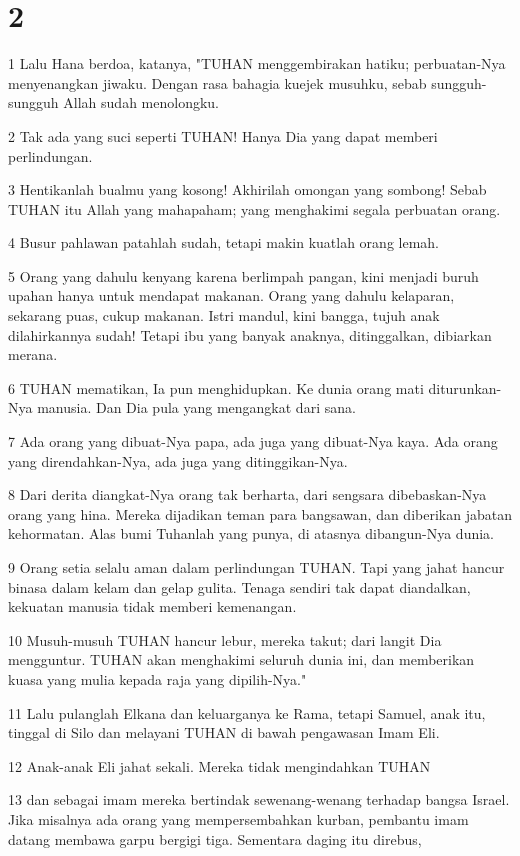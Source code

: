 \chapter{2}

\par 1 Lalu Hana berdoa, katanya, "TUHAN menggembirakan hatiku; perbuatan-Nya menyenangkan jiwaku. Dengan rasa bahagia kuejek musuhku, sebab sungguh-sungguh Allah sudah menolongku.
\par 2 Tak ada yang suci seperti TUHAN! Hanya Dia yang dapat memberi perlindungan.
\par 3 Hentikanlah bualmu yang kosong! Akhirilah omongan yang sombong! Sebab TUHAN itu Allah yang mahapaham; yang menghakimi segala perbuatan orang.
\par 4 Busur pahlawan patahlah sudah, tetapi makin kuatlah orang lemah.
\par 5 Orang yang dahulu kenyang karena berlimpah pangan, kini menjadi buruh upahan hanya untuk mendapat makanan. Orang yang dahulu kelaparan, sekarang puas, cukup makanan. Istri mandul, kini bangga, tujuh anak dilahirkannya sudah! Tetapi ibu yang banyak anaknya, ditinggalkan, dibiarkan merana.
\par 6 TUHAN mematikan, Ia pun menghidupkan. Ke dunia orang mati diturunkan-Nya manusia. Dan Dia pula yang mengangkat dari sana.
\par 7 Ada orang yang dibuat-Nya papa, ada juga yang dibuat-Nya kaya. Ada orang yang direndahkan-Nya, ada juga yang ditinggikan-Nya.
\par 8 Dari derita diangkat-Nya orang tak berharta, dari sengsara dibebaskan-Nya orang yang hina. Mereka dijadikan teman para bangsawan, dan diberikan jabatan kehormatan. Alas bumi Tuhanlah yang punya, di atasnya dibangun-Nya dunia.
\par 9 Orang setia selalu aman dalam perlindungan TUHAN. Tapi yang jahat hancur binasa dalam kelam dan gelap gulita. Tenaga sendiri tak dapat diandalkan, kekuatan manusia tidak memberi kemenangan.
\par 10 Musuh-musuh TUHAN hancur lebur, mereka takut; dari langit Dia mengguntur. TUHAN akan menghakimi seluruh dunia ini, dan memberikan kuasa yang mulia kepada raja yang dipilih-Nya."
\par 11 Lalu pulanglah Elkana dan keluarganya ke Rama, tetapi Samuel, anak itu, tinggal di Silo dan melayani TUHAN di bawah pengawasan Imam Eli.
\par 12 Anak-anak Eli jahat sekali. Mereka tidak mengindahkan TUHAN
\par 13 dan sebagai imam mereka bertindak sewenang-wenang terhadap bangsa Israel. Jika misalnya ada orang yang mempersembahkan kurban, pembantu imam datang membawa garpu bergigi tiga. Sementara daging itu direbus,
